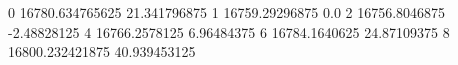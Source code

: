 0 16780.634765625 21.341796875
1 16759.29296875 0.0
2 16756.8046875 -2.48828125
4 16766.2578125 6.96484375
6 16784.1640625 24.87109375
8 16800.232421875 40.939453125
